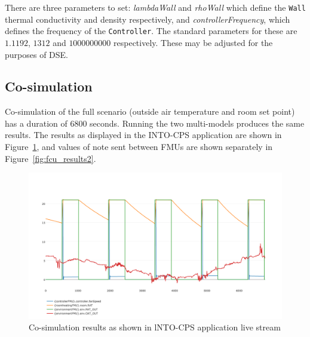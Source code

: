 There are three parameters to set: \emph{lambdaWall} and \emph{rhoWall} which define the \texttt{Wall} thermal conductivity and density respectively, and \emph{controllerFrequency}, which defines the frequency of the \texttt{Controller}. The standard parameters for these are $1.1192$, $1312$ and $1000000000$ respectively. These may be adjusted for the purposes of DSE.

\subsection{Co-simulation}
\label{sec:fcu_into_co}

Co-simulation of the full scenario (outside air temperature and room set point) has a duration of 6800 seconds. Running the two multi-models produces the same results. The results as displayed in the INTO-CPS application are shown in Figure~\ref{fig:fcu_results}, and values of note sent between FMUs are shown separately in Figure~\ref{fig:fcu_results2}.

\begin{figure}[htb!]
\begin{center}
   \includegraphics[width=1\linewidth]{fcu/fcu_cosim_app} 
  \caption{Co-simulation results as shown in lNTO-CPS application live stream}
\label{fig:fcu_results}
\end{center}
\end{figure}

